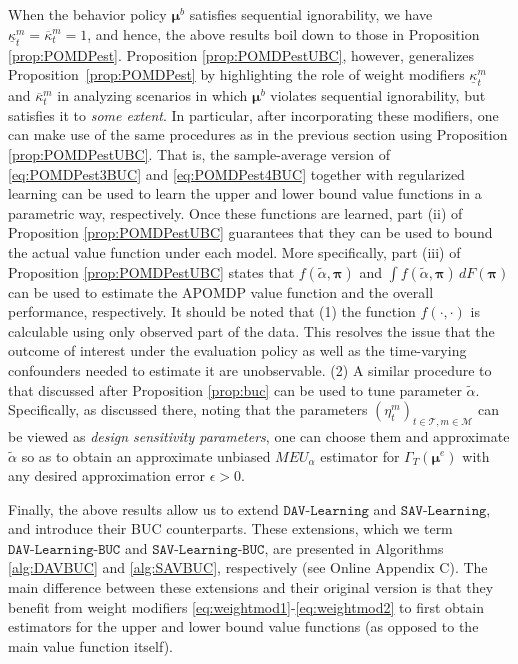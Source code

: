 \documentclass[opre,nonblindrev]{informs2}%
\newcommand{\1}{\hbox{\rm 1\kern-.35em 1}}
\newcommand{\MT}{\mathscr T}
\newcommand{\MM}{\mathscr M}
\newcommand{\bpi}{\boldsymbol{\pi}}
\newcommand{\bmu}{\boldsymbol{\mu}}
\newcommand{\un}{\underline}
\newcommand{\ov}{\overline}
\newcommand{\SAV}{\texttt{SAV-Learning}}
\newcommand{\DAV}{\texttt{DAV-Learning}}
\newcommand{\SAVBUC}{\texttt{SAV-Learning-BUC}}
\newcommand{\DAVBUC}{\texttt{DAV-Learning-BUC}}
\begin{document}
When the behavior policy $\bmu^b$ satisfies sequential ignorability, we have $\un \kappa^m_t=\ov \kappa^m_t=1$, and hence, the above results boil down to those in Proposition \ref{prop:POMDPest}. Proposition \ref{prop:POMDPestUBC}, however, generalizes Proposition~\ref{prop:POMDPest} by highlighting the role of weight modifiers $\un \kappa^m_t$ and $\ov \kappa^m_t$  in analyzing scenarios in which $\bmu^b$ violates sequential ignorability, but satisfies it to {\em some extent}. In particular,  after incorporating these modifiers, one can make use of the same procedures as in the previous section using Proposition \ref{prop:POMDPestUBC}. That is, the sample-average version of \eqref{eq:POMDPest3BUC} and \eqref{eq:POMDPest4BUC} together with regularized learning can be used to learn the upper and lower bound value functions in a parametric way, respectively. Once these functions are learned, part (ii) of Proposition \ref{prop:POMDPestUBC} guarantees that they can be used to bound the actual value function under each model. More specifically, part (iii) of Proposition \ref{prop:POMDPestUBC} states that  $f(\tilde\alpha, \bpi)$ and $\int f(\tilde\alpha, \bpi)\,dF(\bpi)$ can be used to estimate the APOMDP value function and the overall performance, respectively. It should be noted that  (1) the function $f(\cdot, \cdot)$ is calculable using only observed part of the data. This resolves the issue that the outcome of interest under the evaluation policy as well as the time-varying confounders needed to estimate it are unobservable. (2) A similar procedure to that discussed after Proposition \ref{prop:buc} can be used to tune parameter $\tilde\alpha$. Specifically, as discussed there, noting that the parameters $(\eta_t^m)_{t\in\MT,m\in\MM}$ can be viewed as {\em design sensitivity parameters}, one can choose them and approximate $\tilde\alpha$ so as to obtain an approximate unbiased $MEU_\alpha$ estimator for  $\Gamma_T (\bmu^e)$ with any desired approximation error $\epsilon>0$.

Finally, the above results allow us to extend $\DAV$ and $\SAV$, and introduce their BUC counterparts. These extensions, which we term  $\DAVBUC$ and $\SAVBUC$, are presented in Algorithms  \ref{alg:DAVBUC} and \ref{alg:SAVBUC}, respectively (see Online Appendix C). The main difference between these extensions and their original version is that they benefit from weight modifiers \eqref{eq:weightmod1}-\eqref{eq:weightmod2} to first obtain estimators for the upper and lower bound value functions (as opposed to the main value function itself).
\end{document}
